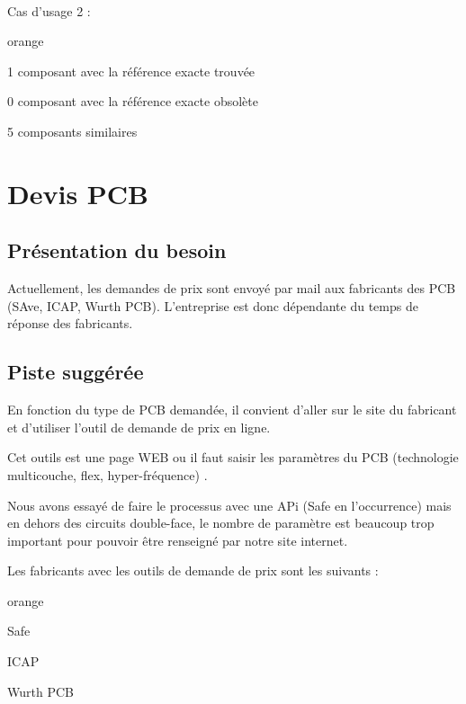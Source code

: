 {\\

Cas d'usage 2 : \\

\begin{items}{orange}{\Bullet}
\item 1 composant avec la référence exacte trouvée
\item 0 composant avec la référence exacte obsolète
\item 5 composants similaires
\end{items}



\chapter{Devis PCB}

\section{Présentation du besoin}

Actuellement, les demandes de prix sont envoyé par mail aux fabricants des PCB (SAve, ICAP, Wurth PCB). L'entreprise est donc dépendante du temps de réponse des fabricants.

\section{Piste suggérée}

En fonction du type de PCB demandée, il convient d'aller sur le site du fabricant et d’utiliser l'outil de demande de prix en ligne.

Cet outils est une page WEB ou il faut saisir les paramètres du PCB (technologie multicouche, flex, hyper-fréquence)
.

Nous avons essayé de faire le processus avec une APi (Safe en l’occurrence) mais en dehors des circuits double-face, le nombre de paramètre est beaucoup trop important pour pouvoir être renseigné par notre site internet.


Les fabricants avec les outils de demande de prix sont les suivants : 

\begin{items}{orange}{\Bullet}
\item Safe
\item ICAP
\item Wurth PCB
\end{items}



}
